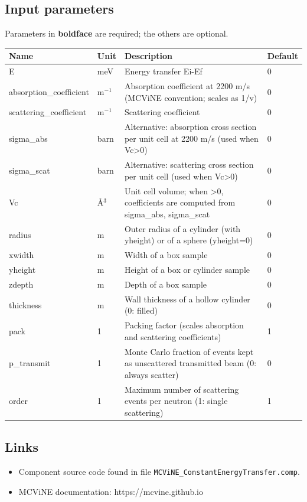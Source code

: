 \subsection*{Input parameters}
Parameters in \textbf{boldface} are required; the others are optional.

\begin{longtable}{p{}p{}p{}p{}}
\toprule
\textbf{Name} & \textbf{Unit} & \textbf{Description} & \textbf{Default} \\
\midrule
\endhead
E & meV & Energy transfer Ei-Ef & 0 \\
absorption\_coefficient & m$^{-1}$ & Absorption coefficient at 2200 m/s (MCViNE convention; scales as 1/v) & 0 \\
scattering\_coefficient & m$^{-1}$ & Scattering coefficient & 0 \\
sigma\_abs & barn & Alternative: absorption cross section per unit cell at 2200 m/s (used when Vc\textgreater{}0) & 0 \\
sigma\_scat & barn & Alternative: scattering cross section per unit cell (used when Vc\textgreater{}0) & 0 \\
Vc & \AA{}$^{3}$ & Unit cell volume; when \textgreater{}0, coefficients are computed from sigma\_abs, sigma\_scat & 0 \\
radius & m & Outer radius of a cylinder (with yheight) or of a sphere (yheight=0) & 0 \\
xwidth & m & Width of a box sample & 0 \\
yheight & m & Height of a box or cylinder sample & 0 \\
zdepth & m & Depth of a box sample & 0 \\
thickness & m & Wall thickness of a hollow cylinder (0: filled) & 0 \\
pack & 1 & Packing factor (scales absorption and scattering coefficients) & 1 \\
p\_transmit & 1 & Monte Carlo fraction of events kept as unscattered transmitted beam (0: always scatter) & 0 \\
order & 1 & Maximum number of scattering events per neutron (1: single scattering) & 1 \\
\bottomrule
\end{longtable}

\subsection*{Links}
\begin{itemize}
  \item Component source code found in file \texttt{MCViNE\_ConstantEnergyTransfer.comp}.
  \item MCViNE documentation: https://mcvine.github.io
\end{itemize}
